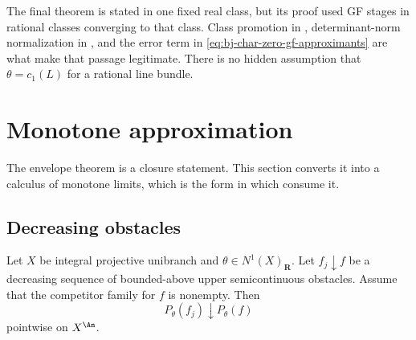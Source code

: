\begin{remark}
\label{rem:ch45-real-class-drift}
The final theorem is stated in one fixed real class, but its proof used GF
stages in rational classes converging to that class.
Class promotion in ,
determinant-norm normalization in ,
and the error term in \eqref{eq:bj-char-zero-gf-approximants} are what make
that passage legitimate.
There is no hidden assumption that $\theta=c_1(L)$ for a rational line
bundle.
\end{remark}

\section{Monotone approximation}
\label{sec:ch45-monotone}

The envelope theorem is a closure statement.  This section converts it into
a calculus of monotone limits, which is the form in which
 consume it.

\subsection{Decreasing obstacles}
\label{sec:ch45-decreasing-obstacles}

\begin{theorem}\label{thm:bj-final-decreasing-obstacles}
Let $X$ be integral projective unibranch and
$\theta\in N^1(X)_{\mathbf R}$.  Let $f_j\downarrow f$ be a decreasing
sequence of bounded-above upper semicontinuous obstacles.
Assume that the competitor family for $f$ is nonempty.
Then
\[
                         P_\theta(f_j)\downarrow P_\theta(f)
\tag{45.9}\label{eq:bj-final-decreasing-obstacles}
\]
pointwise on $X^{\An}$.
\end{theorem}

